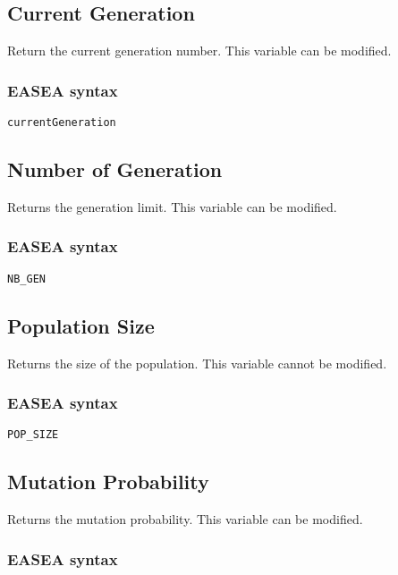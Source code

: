 \documentclass{book}
\begin{document}
\subsection{Current Generation}\label{current-generation}

Return the current generation number. This variable can be modified.

\subsubsection{EASEA syntax}\label{easea-syntax-2}

\texttt{currentGeneration}

\subsection{Number of Generation}\label{number-of-generation}

Returns the generation limit. This variable can be modified.

\subsubsection{EASEA syntax}\label{easea-syntax-3}

\texttt{NB\_GEN}

\subsection{Population Size}\label{population-size}

Returns the size of the population. This variable cannot be modified.

\subsubsection{EASEA syntax}\label{easea-syntax-4}

\texttt{POP\_SIZE}

\subsection{Mutation Probability}\label{mutation-probability}

Returns the mutation probability. This variable can be modified.

\subsubsection{EASEA syntax}\label{easea-syntax-5}
\end{document}

